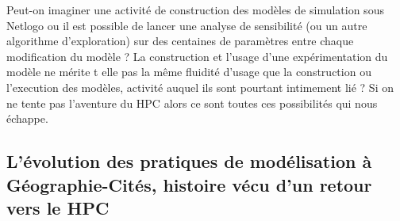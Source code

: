 Peut-on imaginer une activité de construction des modèles de simulation sous Netlogo ou il est possible de lancer une analyse de sensibilité (ou un autre algorithme d'exploration) sur des centaines de paramètres entre chaque modification du modèle ? La construction et l'usage d'une expérimentation du modèle ne mérite t elle pas la même fluidité d'usage que la construction ou l'execution des modèles, activité auquel ils sont pourtant intimement lié ? Si on ne tente pas l'aventure du HPC alors ce sont toutes ces possibilités qui nous échappe.

\subsection{L'évolution des pratiques de modélisation à Géographie-Cités, histoire vécu d'un retour vers le HPC}
\label{ssec:hist_pratiques}





